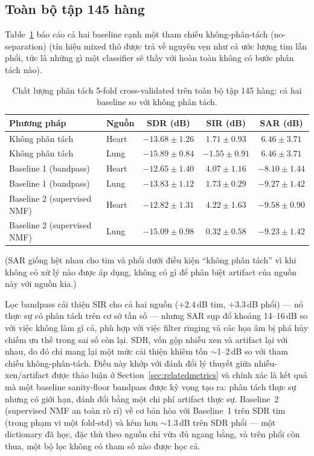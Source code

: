 \documentclass[11pt]{article}
\begin{document}
\subsection{Toàn bộ tập 145 hàng}

Table~\ref{tab:baselinefull} báo cáo cả hai baseline cạnh một tham chiếu
không-phân-tách (no-separation) (tín hiệu mixed thô được trả về nguyên
vẹn như cả ước lượng tim lẫn phổi, tức là những gì một classifier sẽ thấy
với hoàn toàn không có bước phân tách nào).

\begin{table}[H]
\centering
\caption{Chất lượng phân tách 5-fold cross-validated trên toàn bộ tập 145 hàng: cả hai baseline so với không phân tách.}
\label{tab:baselinefull}
\begin{tabular}{@{}llccc@{}}
\toprule
Phương pháp & Nguồn & SDR (dB) & SIR (dB) & SAR (dB) \\
\midrule
Không phân tách & Heart & $-13.68 \pm 1.26$ & $1.71 \pm 0.93$  & $6.46 \pm 3.71$ \\
Không phân tách & Lung  & $-15.89 \pm 0.84$ & $-1.55 \pm 0.91$ & $6.46 \pm 3.71$ \\
\addlinespace
Baseline 1 (bandpass) & Heart & $-12.65 \pm 1.40$ & $4.07 \pm 1.16$  & $-8.10 \pm 1.44$ \\
Baseline 1 (bandpass) & Lung  & $-13.83 \pm 1.12$ & $1.73 \pm 0.29$  & $-9.27 \pm 1.42$ \\
\addlinespace
Baseline 2 (supervised NMF) & Heart & $-12.82 \pm 1.31$ & $4.22 \pm 1.63$  & $-9.58 \pm 0.90$ \\
Baseline 2 (supervised NMF) & Lung  & $-15.09 \pm 0.98$ & $0.32 \pm 0.58$  & $-9.23 \pm 1.42$ \\
\bottomrule
\end{tabular}
\end{table}

\noindent (SAR giống hệt nhau cho tim và phổi dưới điều kiện ``không
phân tách'' vì khi không có xử lý nào được áp dụng, không có gì để phân
biệt artifact của nguồn này với nguồn kia.)

Lọc bandpass cải thiện SIR cho cả hai nguồn ($+2.4$\,dB tim,
$+3.3$\,dB phổi) --- nó thực sự có phân tách trên cơ sở tần số --- nhưng
SAR sụp đổ khoảng 14--16\,dB so với việc không làm gì cả, phù hợp với
việc filter ringing và các họa âm bị phá hủy chiếm ưu thế trong sai số
còn lại. SDR, vốn gộp nhiễu xen và artifact lại với nhau, do đó chỉ mang
lại một mức cải thiện khiêm tốn $\sim$1--2\,dB so với tham chiếu
không-phân-tách. Điều này khớp với đánh đổi lý thuyết giữa
nhiễu-xen/artifact được thảo luận ở Section~\ref{sec:relatedmetrics} và
chính xác là kết quả mà một baseline sanity-floor bandpass được kỳ vọng
tạo ra: phân tách thực sự nhưng có giới hạn, đánh đổi bằng một chi phí
artifact thực sự. Baseline~2 (supervised NMF an toàn rò rỉ) về cơ bản
hòa với Baseline~1 trên SDR tim (trong phạm vi một fold-std) và kém hơn
$\sim$1.3\,dB trên SDR phổi --- một dictionary đã học, đặc thù theo
nguồn chỉ vừa đủ ngang bằng, và trên phổi còn thua, một bộ lọc không có
tham số nào được học cả.
\end{document}
